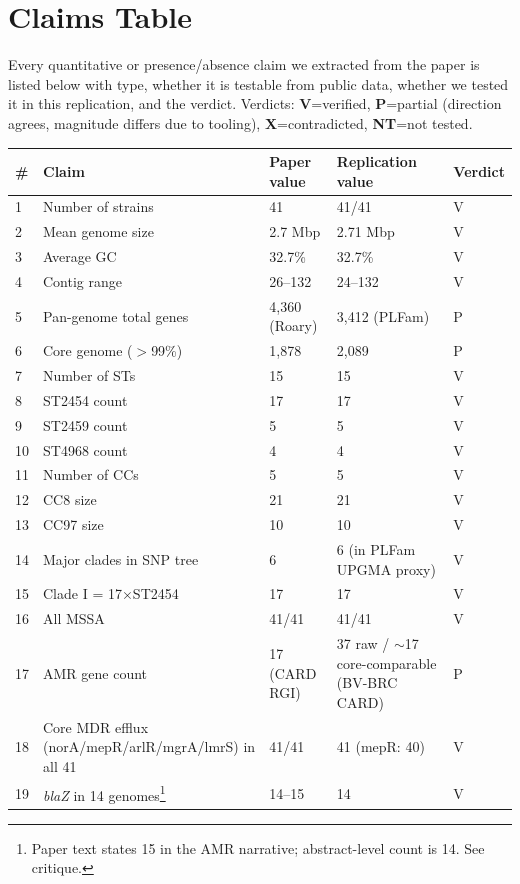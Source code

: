 \documentclass[11pt]{article}
\begin{document}
\section{Claims Table}
Every quantitative or presence/absence claim we extracted from the paper is
listed below with type, whether it is testable from public data, whether we
tested it in this replication, and the verdict. Verdicts: {\color{green!60!black}\textbf{V}}=verified, {\color{orange!80!black}\textbf{P}}=partial (direction agrees, magnitude differs due to tooling), \textbf{X}=contradicted, \textbf{NT}=not tested.

\begin{small}
\begin{longtable}{@{}p{0.5cm} p{7.5cm} p{2.5cm} p{2.5cm} p{1.2cm}@{}}
\toprule
\# & Claim & Paper value & Replication value & Verdict \\
\midrule
\endhead
1  & Number of strains & 41 & 41/41 & V \\
2  & Mean genome size & 2.7 Mbp & 2.71 Mbp & V \\
3  & Average GC & 32.7\% & 32.7\% & V \\
4  & Contig range & 26--132 & 24--132 & V \\
5  & Pan-genome total genes & 4{,}360 (Roary) & 3{,}412 (PLFam) & P \\
6  & Core genome ($>$99\%) & 1{,}878 & 2{,}089 & P \\
7  & Number of STs & 15 & 15 & V \\
8  & ST2454 count & 17 & 17 & V \\
9  & ST2459 count & 5 & 5 & V \\
10 & ST4968 count & 4 & 4 & V \\
11 & Number of CCs & 5 & 5 & V \\
12 & CC8 size & 21 & 21 & V \\
13 & CC97 size & 10 & 10 & V \\
14 & Major clades in SNP tree & 6 & 6 (in PLFam UPGMA proxy) & V \\
15 & Clade I = 17$\times$ST2454 & 17 & 17 & V \\
16 & All MSSA & 41/41 & 41/41 & V \\
17 & AMR gene count & 17 (CARD RGI) & 37 raw / $\sim$17 core-comparable (BV-BRC CARD) & P \\
18 & Core MDR efflux (norA/mepR/arlR/mgrA/lmrS) in all 41 & 41/41 & 41 (mepR: 40) & V \\
19 & \emph{blaZ} in 14 genomes\footnote{Paper text states 15 in the AMR narrative; abstract-level count is 14. See critique.} & 14--15 & 14 & V \\

\end{longtable}
\end{small}
\end{document}
